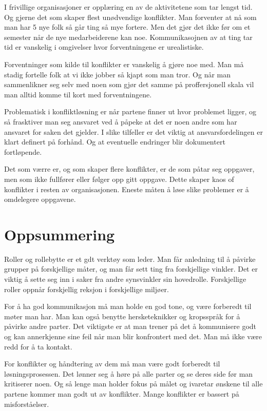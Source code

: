 \documentclass[12pt, a4paper]{article}
\begin{document}
I frivillige organisasjoner er opplæring en av de aktivitetene som tar lengst
tid. Og gjerne det som skaper flest unødvendige konflikter. Man forventer at
nå som man har 5 nye folk så går ting så mye fortere. Men det gjør det ikke før
om et semester når de nye medarbeiderene kan noe. Kommunikasojnen av at ting
tar tid er vanskelig i omgivelser hvor forventningene er urealistiske. 

Forventninger som kilde til konflikter er vanskelig å gjøre noe med. Man må
stadig fortelle folk at vi ikke jobber så kjapt som man tror. Og når man
sammenlikner seg selv med noen som gjør det samme på proffersjonell skala vil
man alltid komme til kort med forventningene.      

Problematisk i konfliktløsning er når partene finner ut hvor problemet ligger,
og så frasktiver man seg ansvaret ved å påpeke at det er noen andre som har
ansvaret for saken det gjelder. I slike tilfeller er det viktig at
ansvarsfordelingen er klart definert på forhånd. Og at eventuelle endringer
blir dokumentert fortløpende.  

Det som værre er, og som skaper flere konflikter, er de som påtar seg oppgaver,
men som ikke fullfører eller følger opp gitt oppgave. Dette skaper kaos of
konflikter i resten av organisasjonen. Eneste måten å løse slike problemer er å
omdelegere oppgavene.   

\section{Oppsummering}\label{konklusjon}
Roller og rollebytte er et gdt verktøy som leder. Man får anledning til å
påvirke grupper på forskjellige måter, og man får sett ting fra forskjellige
vinkler. Det er viktig å sette seg inn i saker fra andre synsvinkler sin
hovedrolle. Forskjellige roller oppnår forskjellig reksjon i forskjellige
miljøer.

For å ha god kommunikasjon må man holde en god tone, og være forberedt til
møter man har. Man kan også benytte hersketeknikker og kropsspråk for å påvirke
andre parter. Det viktigste er at man trener på det å kommunisere godt og kan
annerkjenne sine feil når man blir konfrontert med det. Man må ikke være redd
for å ta kontakt. 

For konflikter og håndtering av dem må man være godt forberedt til
løsningsprosessen. Det lønner seg å høre på alle parter og se deres side før
man kritiserer noen. Og så lenge man holder fokus på målet og ivaretar ønskene
til alle partene kommer man godt ut av konflikter. Mange konflikter er bassert
på misforståelser.  
\end{document}
